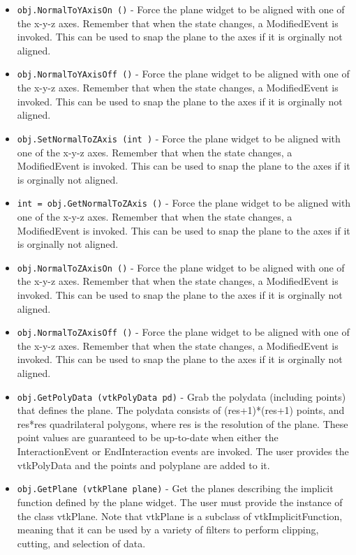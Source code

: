 \begin{itemize}
\item  \verb|obj.NormalToYAxisOn ()| -  Force the plane widget to be aligned with one of the x-y-z axes.
 Remember that when the state changes, a ModifiedEvent is invoked.
 This can be used to snap the plane to the axes if it is orginally
 not aligned.

\item  \verb|obj.NormalToYAxisOff ()| -  Force the plane widget to be aligned with one of the x-y-z axes.
 Remember that when the state changes, a ModifiedEvent is invoked.
 This can be used to snap the plane to the axes if it is orginally
 not aligned.

\item  \verb|obj.SetNormalToZAxis (int )| -  Force the plane widget to be aligned with one of the x-y-z axes.
 Remember that when the state changes, a ModifiedEvent is invoked.
 This can be used to snap the plane to the axes if it is orginally
 not aligned.

\item  \verb|int = obj.GetNormalToZAxis ()| -  Force the plane widget to be aligned with one of the x-y-z axes.
 Remember that when the state changes, a ModifiedEvent is invoked.
 This can be used to snap the plane to the axes if it is orginally
 not aligned.

\item  \verb|obj.NormalToZAxisOn ()| -  Force the plane widget to be aligned with one of the x-y-z axes.
 Remember that when the state changes, a ModifiedEvent is invoked.
 This can be used to snap the plane to the axes if it is orginally
 not aligned.

\item  \verb|obj.NormalToZAxisOff ()| -  Force the plane widget to be aligned with one of the x-y-z axes.
 Remember that when the state changes, a ModifiedEvent is invoked.
 This can be used to snap the plane to the axes if it is orginally
 not aligned.

\item  \verb|obj.GetPolyData (vtkPolyData pd)| -  Grab the polydata (including points) that defines the plane.  The
 polydata consists of (res+1)*(res+1) points, and res*res quadrilateral
 polygons, where res is the resolution of the plane. These point values
 are guaranteed to be up-to-date when either the InteractionEvent or
 EndInteraction events are invoked. The user provides the vtkPolyData and
 the points and polyplane are added to it.

\item  \verb|obj.GetPlane (vtkPlane plane)| -  Get the planes describing the implicit function defined by the plane
 widget. The user must provide the instance of the class vtkPlane. Note
 that vtkPlane is a subclass of vtkImplicitFunction, meaning that it can
 be used by a variety of filters to perform clipping, cutting, and
 selection of data.


\end{itemize}
